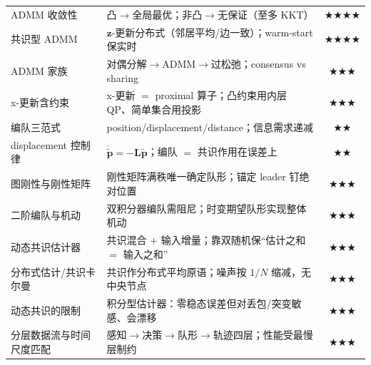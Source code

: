\begin{table}[H]
\begin{tabular}{p{4.4cm}p{8.0cm}c}
ADMM 收敛性 & 凸$\to$全局最优；非凸$\to$无保证（至多 KKT） & $\bigstar\bigstar\bigstar\bigstar$ \\
共识型 ADMM & $\mathbf{z}$-更新分布式（邻居平均/边一致）；warm-start 保实时 & $\bigstar\bigstar\bigstar\bigstar$ \\
ADMM 家族 & 对偶分解$\to$ADMM$\to$过松弛；consensus vs sharing & $\bigstar\bigstar\bigstar$ \\
x-更新含约束 & x-更新 $=$ proximal 算子；凸约束用内层 QP、简单集合用投影 & $\bigstar\bigstar\bigstar$ \\
编队三范式 & position/displacement/distance；信息需求递减 & $\bigstar\bigstar$ \\
displacement 控制律 & $\dot{\tilde{\mathbf{p}}}=-\mathbf{L}\tilde{\mathbf{p}}$；编队 $=$ 共识作用在误差上 & $\bigstar\bigstar$ \\
图刚性与刚性矩阵 & 刚性矩阵满秩唯一确定队形；锚定 leader 钉绝对位置 & $\bigstar\bigstar\bigstar$ \\
二阶编队与机动 & 双积分器编队需阻尼；时变期望队形实现整体机动 & $\bigstar\bigstar\bigstar$ \\
动态共识估计器 & 共识混合 + 输入增量；靠双随机保“估计之和 $=$ 输入之和” & $\bigstar\bigstar\bigstar$ \\
分布式估计/共识卡尔曼 & 共识作分布式平均原语；噪声按 $1/N$ 缩减，无中央节点 & $\bigstar\bigstar\bigstar$ \\
动态共识的限制 & 积分型估计器：零稳态误差但对丢包/突变敏感、会漂移 & $\bigstar\bigstar\bigstar$ \\
分层数据流与时间尺度匹配 & 感知$\to$决策$\to$队形$\to$轨迹四层；性能受最慢层制约 & $\bigstar\bigstar\bigstar$ \\
\bottomrule
\end{tabular}
\end{table}

